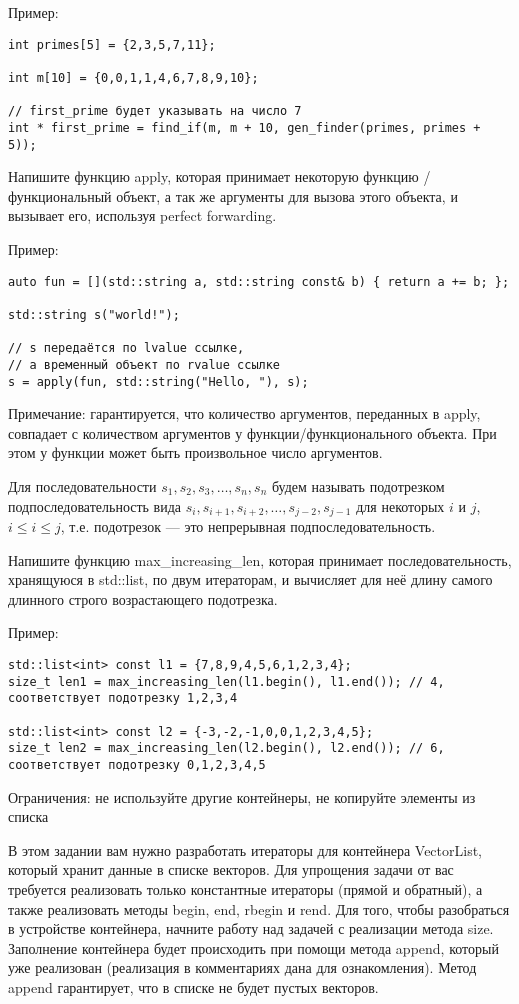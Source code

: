 \documentclass[]{article}
\begin{document}
\begin{enumerate}
Пример:
\begin{verbatim}
int primes[5] = {2,3,5,7,11};

int m[10] = {0,0,1,1,4,6,7,8,9,10};

// first_prime будет указывать на число 7
int * first_prime = find_if(m, m + 10, gen_finder(primes, primes + 5));
\end{verbatim}




Напишите функцию apply, которая принимает некоторую функцию / функциональный объект, а так же аргументы для вызова этого объекта, и вызывает его, используя perfect forwarding.

Пример:
\begin{verbatim}
auto fun = [](std::string a, std::string const& b) { return a += b; };

std::string s("world!");

// s передаётся по lvalue ссылке,
// а временный объект по rvalue ссылке 
s = apply(fun, std::string("Hello, "), s);
\end{verbatim}
Примечание: гарантируется, что количество аргументов, переданных в apply, совпадает с количеством аргументов у функции/функционального объекта. При этом у функции может быть произвольное число аргументов.


Для последовательности $s_{1},s_{2},s_{3},\dots,s_{n},s_n $ будем называть подотрезком подпоследовательность вида 
$s_i,s_{i+1},s_{i+2},\dots,s_{j-2},s_{j-1}$ для некоторых $i$ и $j$, $i\le i\le j $, 
т.е. подотрезок — это непрерывная подпоследовательность.

Напишите функцию max\_increasing\_len, которая принимает последовательность, хранящуюся в std::list, по двум итераторам, и вычисляет для неё длину самого длинного строго возрастающего подотрезка.

Пример:
\begin{verbatim}
std::list<int> const l1 = {7,8,9,4,5,6,1,2,3,4};
size_t len1 = max_increasing_len(l1.begin(), l1.end()); // 4, соответствует подотрезку 1,2,3,4

std::list<int> const l2 = {-3,-2,-1,0,0,1,2,3,4,5};
size_t len2 = max_increasing_len(l2.begin(), l2.end()); // 6, соответствует подотрезку 0,1,2,3,4,5

\end{verbatim}
Ограничения: не используйте другие контейнеры, не копируйте элементы из списка



В этом задании вам нужно разработать итераторы для контейнера VectorList, который хранит данные в списке векторов. Для упрощения задачи от вас требуется реализовать только константные итераторы (прямой и обратный), а также реализовать методы begin, end, rbegin и rend. Для того, чтобы разобраться в устройстве контейнера, начните работу над задачей с реализации метода size. Заполнение контейнера будет происходить при помощи метода append, который уже реализован (реализация в комментариях дана для ознакомления). Метод append гарантирует, что в списке не будет пустых векторов.


\end{enumerate}
\end{document}
